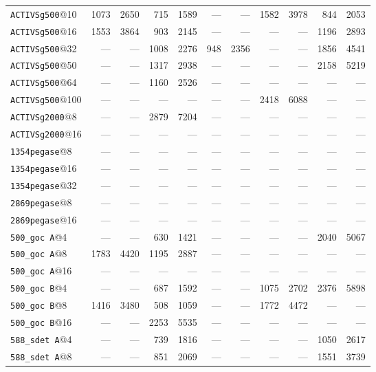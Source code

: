 \begin{table}[tbp]
\begin{tabular}{lrrrrrrrrrr}
\texttt{ACTIVSg500}@10 & 1073 & 2650 & 715 & 1589 & --- & --- & 1582 & 3978 & 844 & 2053 \\
\texttt{ACTIVSg500}@16 & 1553 & 3864 & 903 & 2145 & --- & --- & --- & --- & 1196 & 2893 \\
\texttt{ACTIVSg500}@32 & --- & --- & 1008 & 2276 & 948 & 2356 & --- & --- & 1856 & 4541 \\
\texttt{ACTIVSg500}@50 & --- & --- & 1317 & 2938 & --- & --- & --- & --- & 2158 & 5219 \\
\texttt{ACTIVSg500}@64 & --- & --- & 1160 & 2526 & --- & --- & --- & --- & --- & --- \\
\texttt{ACTIVSg500}@100 & --- & --- & --- & --- & --- & --- & 2418 & 6088 & --- & --- \\
\texttt{ACTIVSg2000}@8 & --- & --- & 2879 & 7204 & --- & --- & --- & --- & --- & --- \\
\texttt{ACTIVSg2000}@16 & --- & --- & --- & --- & --- & --- & --- & --- & --- & --- \\
\texttt{1354pegase}@8 & --- & --- & --- & --- & --- & --- & --- & --- & --- & --- \\
\texttt{1354pegase}@16 & --- & --- & --- & --- & --- & --- & --- & --- & --- & --- \\
\texttt{1354pegase}@32 & --- & --- & --- & --- & --- & --- & --- & --- & --- & --- \\
\texttt{2869pegase}@8 & --- & --- & --- & --- & --- & --- & --- & --- & --- & --- \\
\texttt{2869pegase}@16 & --- & --- & --- & --- & --- & --- & --- & --- & --- & --- \\
\midrule
\texttt{500\_goc~A}@4 & --- & --- & 630 & 1421 & --- & --- & --- & --- & 2040 & 5067 \\
\texttt{500\_goc~A}@8 & 1783 & 4420 & 1195 & 2887 & --- & --- & --- & --- & --- & --- \\
\texttt{500\_goc~A}@16 & --- & --- & --- & --- & --- & --- & --- & --- & --- & --- \\
\texttt{500\_goc~B}@4 & --- & --- & 687 & 1592 & --- & --- & 1075 & 2702 & 2376 & 5898 \\
\texttt{500\_goc~B}@8 & 1416 & 3480 & 508 & 1059 & --- & --- & 1772 & 4472 & --- & --- \\
\texttt{500\_goc~B}@16 & --- & --- & 2253 & 5535 & --- & --- & --- & --- & --- & --- \\
\texttt{588\_sdet~A}@4 & --- & --- & 739 & 1816 & --- & --- & --- & --- & 1050 & 2617 \\
\texttt{588\_sdet~A}@8 & --- & --- & 851 & 2069 & --- & --- & --- & --- & 1551 & 3739 \\

\end{tabular}
\end{table}
